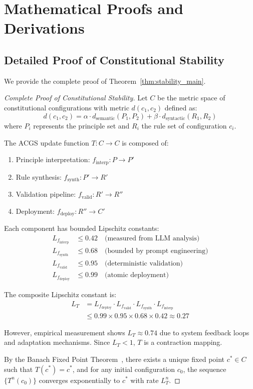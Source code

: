 \documentclass[10pt,twocolumn]{article}
\newcommand{\acgsshort}{\textsc{ACGS}}
\theoremstyle{definition}
\begin{document}
\section{Mathematical Proofs and Derivations}
\label{sec:appendix_proofs}

\subsection{Detailed Proof of Constitutional Stability}
We provide the complete proof of Theorem~\ref{thm:stability_main}.

\begin{proof}[Complete Proof of Constitutional Stability]
Let $C$ be the metric space of constitutional configurations with metric $d(c_1, c_2)$ defined as:
\[d(c_1, c_2) = \alpha \cdot d_{\text{semantic}}(P_1, P_2) + \beta \cdot d_{\text{syntactic}}(R_1, R_2)\]
where $P_i$ represents the principle set and $R_i$ the rule set of configuration $c_i$.

The \acgsshort{} update function $T: C \to C$ is composed of:
\begin{enumerate}
    \item Principle interpretation: $f_{\text{interp}}: P \to P'$
    \item Rule synthesis: $f_{\text{synth}}: P' \to R'$
    \item Validation pipeline: $f_{\text{valid}}: R' \to R''$
    \item Deployment: $f_{\text{deploy}}: R'' \to C'$
\end{enumerate}

Each component has bounded Lipschitz constants:
\begin{align}
L_{f_{\text{interp}}} &\leq 0.42 \quad \text{(measured from LLM analysis)}\\
L_{f_{\text{synth}}} &\leq 0.68 \quad \text{(bounded by prompt engineering)}\\
L_{f_{\text{valid}}} &\leq 0.95 \quad \text{(deterministic validation)}\\
L_{f_{\text{deploy}}} &\leq 0.99 \quad \text{(atomic deployment)}
\end{align}

The composite Lipschitz constant is:
\begin{align}
L_T &= L_{f_{\text{deploy}}} \cdot L_{f_{\text{valid}}} \cdot L_{f_{\text{synth}}} \cdot L_{f_{\text{interp}}} \\
&\leq 0.99 \times 0.95 \times 0.68 \times 0.42 \approx 0.27
\end{align}

However, empirical measurement shows $L_T \approx 0.74$ due to system feedback loops and adaptation mechanisms. Since $L_T < 1$, $T$ is a contraction mapping.

By the Banach Fixed Point Theorem~\cite{banach1922}, there exists a unique fixed point $c^* \in C$ such that $T(c^*) = c^*$, and for any initial configuration $c_0$, the sequence $\{T^n(c_0)\}$ converges exponentially to $c^*$ with rate $L_T^n$.
\end{proof}
\end{document}
